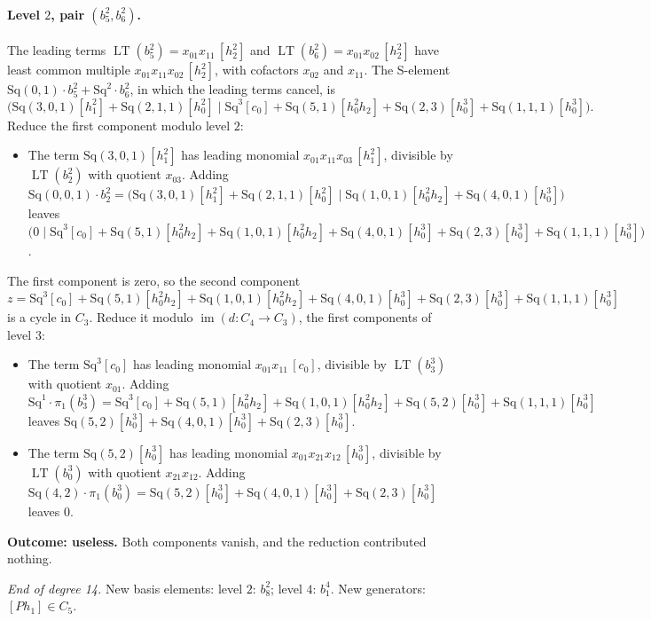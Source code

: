 \documentclass[11pt]{article}
\newcommand{\Sq}{\mathrm{Sq}}
\DeclareMathOperator{\LT}{LT}
\begin{document}
\paragraph{Level $2$, pair $(b^{2}_{5}, b^{2}_{6})$.} The leading terms $\LT(b^{2}_{5}) = x_{01}x_{11}\,[h_2^2]$ and $\LT(b^{2}_{6}) = x_{01}x_{02}\,[h_2^2]$ have least common multiple $x_{01}x_{11}x_{02}\,[h_2^2]$, with cofactors $x_{02}$ and $x_{11}$. The S-element $\Sq(0,1)\cdot b^{2}_{5} + \Sq^{2}\cdot b^{2}_{6}$, in which the leading terms cancel, is
\[\bigl(\Sq(3,0,1)[h_1^2] + \Sq(2,1,1)[h_0^2] \;\big|\; \Sq^{3}[c_0] + \Sq(5,1)[h_0^2h_2] + \Sq(2,3)[h_0^3] + \Sq(1,1,1)[h_0^3]\bigr).\]
Reduce the first component modulo level $2$:
\begin{itemize}
\item The term $\Sq(3,0,1)[h_1^2]$ has leading monomial $x_{01}x_{11}x_{03}\,[h_1^2]$, divisible by $\LT(b^{2}_{2})$ with quotient $x_{03}$. Adding $\Sq(0,0,1)\cdot b^{2}_{2} = \bigl(\Sq(3,0,1)[h_1^2] + \Sq(2,1,1)[h_0^2] \;\big|\; \Sq(1,0,1)[h_0^2h_2] + \Sq(4,0,1)[h_0^3]\bigr)$ leaves $\bigl(0 \;\big|\; \Sq^{3}[c_0] + \Sq(5,1)[h_0^2h_2] + \Sq(1,0,1)[h_0^2h_2] + \Sq(4,0,1)[h_0^3] + \Sq(2,3)[h_0^3] + \Sq(1,1,1)[h_0^3]\bigr)$.
\end{itemize}
The first component is zero, so the second component $z = \Sq^{3}[c_0] + \Sq(5,1)[h_0^2h_2] + \Sq(1,0,1)[h_0^2h_2] + \Sq(4,0,1)[h_0^3] + \Sq(2,3)[h_0^3] + \Sq(1,1,1)[h_0^3]$ is a cycle in $C_{3}$.
Reduce it modulo $\operatorname{im}(d\colon C_{4}\to C_{3})$, the first components of level $3$:
\begin{itemize}
\item The term $\Sq^{3}[c_0]$ has leading monomial $x_{01}x_{11}\,[c_0]$, divisible by $\LT(b^{3}_{3})$ with quotient $x_{01}$. Adding $\Sq^{1}\cdot \pi_1(b^{3}_{3}) = \Sq^{3}[c_0] + \Sq(5,1)[h_0^2h_2] + \Sq(1,0,1)[h_0^2h_2] + \Sq(5,2)[h_0^3] + \Sq(1,1,1)[h_0^3]$ leaves $\Sq(5,2)[h_0^3] + \Sq(4,0,1)[h_0^3] + \Sq(2,3)[h_0^3]$.
\item The term $\Sq(5,2)[h_0^3]$ has leading monomial $x_{01}x_{21}x_{12}\,[h_0^3]$, divisible by $\LT(b^{3}_{0})$ with quotient $x_{21}x_{12}$. Adding $\Sq(4,2)\cdot \pi_1(b^{3}_{0}) = \Sq(5,2)[h_0^3] + \Sq(4,0,1)[h_0^3] + \Sq(2,3)[h_0^3]$ leaves $0$.
\end{itemize}
\textbf{Outcome: useless.} Both components vanish, and the reduction contributed nothing.
\medskip
\par\noindent\emph{End of degree 14.} New basis elements: level $2$: $b^{2}_{8}$; level $4$: $b^{4}_{1}$. New generators: $[Ph_1]\in C_{5}$.
\end{document}
